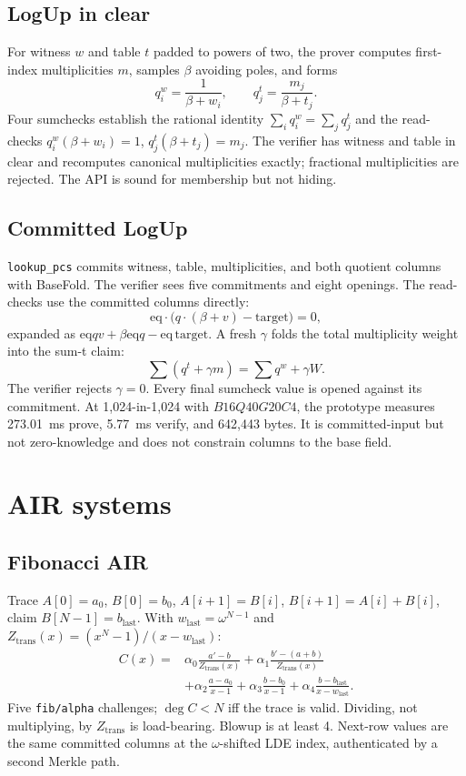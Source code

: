 \documentclass[11pt,a4paper]{article}
\newcommand{\zeq}{\mathrm{eq}}
\begin{document}
\subsection{LogUp in clear}

For witness $w$ and table $t$ padded to powers of two, the prover computes
first-index multiplicities $m$, samples $\beta$ avoiding poles, and forms
\[
q^w_i=\frac{1}{\beta+w_i},\qquad
q^t_j=\frac{m_j}{\beta+t_j}.
\]
Four sumchecks establish the rational identity
$\sum_i q^w_i=\sum_j q^t_j$ and the read-checks
$q^w_i(\beta+w_i)=1$, $q^t_j(\beta+t_j)=m_j$. The verifier has witness and
table in clear and recomputes canonical multiplicities exactly; fractional
multiplicities are rejected. The API is sound for membership but not hiding.

\subsection{Committed LogUp}

\texttt{lookup\_pcs} commits witness, table, multiplicities, and both quotient
columns with BaseFold. The verifier sees five commitments and eight openings.
The read-checks use the committed columns directly:
\[
\zeq\cdot\bigl(q\cdot(\beta+v)-\mathrm{target}\bigr)=0,
\]
expanded as $\zeq qv+\beta\zeq q-\zeq\,\mathrm{target}$. A fresh $\gamma$ folds
the total multiplicity weight into the sum-t claim:
\[
\sum(q^t+\gamma m)=\sum q^w+\gamma W.
\]
The verifier rejects $\gamma=0$. Every final sumcheck value is opened against
its commitment. At 1,024-in-1,024 with $B16Q40G20C4$, the prototype measures
273.01~ms prove, 5.77~ms verify, and 642,443 bytes. It is committed-input but
not zero-knowledge and does not constrain columns to the base field.

\section{AIR systems}

\subsection{Fibonacci AIR}

Trace $A[0]=a_0$, $B[0]=b_0$, $A[i+1]=B[i]$, $B[i+1]=A[i]+B[i]$, claim
$B[N-1]=b_{\mathrm{last}}$. With $w_{\mathrm{last}}=\omega^{N-1}$ and
$Z_{\mathrm{trans}}(x)=(x^N-1)/(x-w_{\mathrm{last}})$:
\[
\begin{aligned}
C(x)={}&\alpha_0\frac{a'-b}{Z_{\mathrm{trans}}(x)}
+\alpha_1\frac{b'-(a+b)}{Z_{\mathrm{trans}}(x)}\\
&+\alpha_2\frac{a-a_0}{x-1}
+\alpha_3\frac{b-b_0}{x-1}
+\alpha_4\frac{b-b_{\mathrm{last}}}{x-w_{\mathrm{last}}}.
\end{aligned}
\]
Five \texttt{fib/alpha} challenges; $\deg C<N$ iff the trace is valid.
Dividing, not multiplying, by $Z_{\mathrm{trans}}$ is load-bearing. Blowup is
at least 4. Next-row values are the same committed columns at the
$\omega$-shifted LDE index, authenticated by a second Merkle path.
\end{document}
